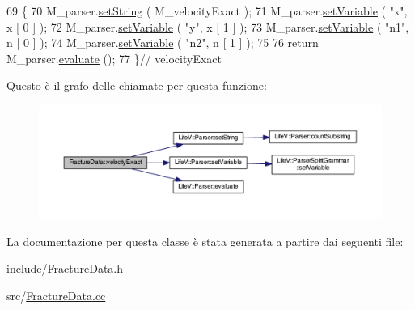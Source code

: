 \begin{DoxyCode}
69 \{
70     M\_parser.\hyperlink{classLifeV_1_1Parser_ac05769e836a0dc95d9c020df361a5194}{setString} ( M\_velocityExact );
71     M\_parser.\hyperlink{classLifeV_1_1Parser_aa2b362e12b8feb60231705d499c9fbae}{setVariable} ( \textcolor{stringliteral}{"x"}, x [ 0 ] );
72     M\_parser.\hyperlink{classLifeV_1_1Parser_aa2b362e12b8feb60231705d499c9fbae}{setVariable} ( \textcolor{stringliteral}{"y"}, x [ 1 ] );
73     M\_parser.\hyperlink{classLifeV_1_1Parser_aa2b362e12b8feb60231705d499c9fbae}{setVariable} ( \textcolor{stringliteral}{"n1"}, n [ 0 ] );
74     M\_parser.\hyperlink{classLifeV_1_1Parser_aa2b362e12b8feb60231705d499c9fbae}{setVariable} ( \textcolor{stringliteral}{"n2"}, n [ 1 ] );
75     
76     \textcolor{keywordflow}{return} M\_parser.\hyperlink{classLifeV_1_1Parser_a51d84fd4ae6d420620e7beee58fad673}{evaluate} ();
77 \}\textcolor{comment}{// velocityExact}
\end{DoxyCode}


Questo è il grafo delle chiamate per questa funzione\-:\nopagebreak
\begin{figure}[H]
\begin{center}
\leavevmode
\includegraphics[width=350pt]{classFractureData_a8342142df05ded99f3a6c8d39dbfdc0e_cgraph}
\end{center}
\end{figure}




La documentazione per questa classe è stata generata a partire dai seguenti file\-:\begin{DoxyCompactItemize}
\item 
include/\hyperlink{FractureData_8h}{Fracture\-Data.\-h}\item 
src/\hyperlink{FractureData_8cc}{Fracture\-Data.\-cc}\end{DoxyCompactItemize}
